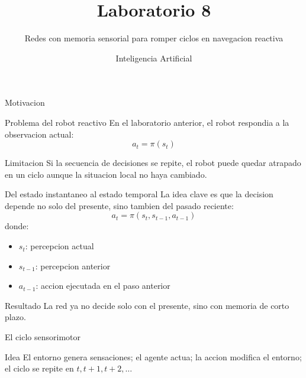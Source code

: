 \documentclass[aspectratio=169,11pt]{beamer}
\title{Laboratorio 8}
\subtitle{Redes con memoria sensorial para romper ciclos en navegacion reactiva}
\author{Inteligencia Artificial}
\date{}
\begin{document}
\begin{frame}
  \titlepage
\end{frame}

\begin{frame}{Motivacion}
  \begin{block}{Problema del robot reactivo}
    En el laboratorio anterior, el robot respondia a la observacion actual:
    \[
    a_t = \pi(s_t)
    \]
  \end{block}
  \begin{alertblock}{Limitacion}
    Si la secuencia de decisiones se repite, el robot puede quedar atrapado en un ciclo aunque la situacion local no haya cambiado.
  \end{alertblock}
\end{frame}

\begin{frame}{Del estado instantaneo al estado temporal}
  La idea clave es que la decision depende no solo del presente, sino tambien del pasado reciente:
  \[
  a_t = \pi(s_t, s_{t-1}, a_{t-1})
  \]
  donde:
  \begin{itemize}
    \item $s_t$: percepcion actual
    \item $s_{t-1}$: percepcion anterior
    \item $a_{t-1}$: accion ejecutada en el paso anterior
  \end{itemize}
  \vspace{0.3cm}
  \begin{block}{Resultado}
    La red ya no decide solo con el presente, sino con memoria de corto plazo.
  \end{block}
\end{frame}

\begin{frame}{El ciclo sensorimotor}
  \begin{center}
  \end{center}
  \vspace{0.3cm}
  \begin{block}{Idea}
    El entorno genera sensaciones; el agente actua; la accion modifica el entorno; el ciclo se repite en $t, t+1, t+2, \dots$
  \end{block}
\end{frame}
\end{document}
